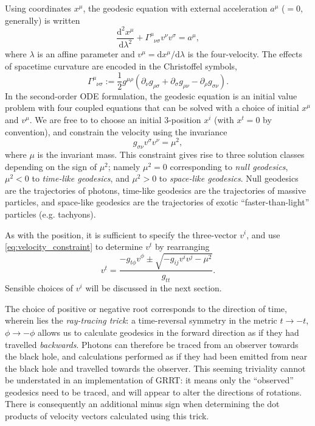 \documentclass[fleqn,usenatbib]{mnras}
\renewcommand{\d}{\text{d}}
\newcommand{\utensor}[3]{#1^{#2}_{\phantom{#2}#3}}
\newcommand{\vel}[1]{v^{#1}}
\begin{document}
Using coordinates $x^\mu$, the geodesic equation with external acceleration
$a^\mu$ ($=0$, generally) is written
\begin{equation}
\label{eq:geodesic_equation}
    \frac{\d^2 x^\mu}{\d \lambda^2}
    + \utensor{\Gamma}{\mu}{\nu\sigma}
    \vel{\nu}
    \vel{\sigma}
    = a^\mu,
\end{equation}
where $\lambda$ is an affine parameter and $v^\mu = \d x^\mu / \d \lambda$ is
the four-velocity. The effects of spacetime curvature are encoded in the
Christoffel symbols,
\begin{equation}
\label{eq:christoffel}
    \utensor{\Gamma}{\mu}{\nu\sigma}
    := \frac{1}{2} g^{\mu\rho}
    \left(
        \partial_{\nu}g_{\rho \sigma}
        + \partial_{\sigma}g_{\rho \nu}
        - \partial_{\rho}g_{\sigma \nu}
    \right).
\end{equation}
In the second-order ODE formulation, the geodesic equation is an initial value
problem with four coupled equations that can be
solved with a choice of initial $x^\mu$ and $\vel{\mu}$. We are free to to
choose an initial 3-position $x^i$ (with $x^t = 0$ by convention), and constrain
the velocity using the invariance
\begin{equation}
\label{eq:velocity_constraint}
    g_{\sigma\nu} \vel{\sigma} \vel{\nu} = \mu^2,
\end{equation}
where $\mu$ is the invariant mass. This constraint gives rise to three solution
classes depending on the sign of $\mu^2$; namely $\mu^2 = 0$ corresponding to
\emph{null geodesics}, $\mu^2 < 0$ to \emph{time-like geodesics}, and $\mu^2 >
0$ to \emph{space-like geodesics}. Null geodesics are the trajectories of
photons, time-like geodesics are the trajectories of massive particles, and
space-like geodesics are the trajectories of exotic ``faster-than-light''
particles (e.g. tachyons).

As with the position, it is sufficient to specify the three-vector $\vel{i}$,
and use \eqref{eq:velocity_constraint} to determine $\vel{t}$ by rearranging
\begin{equation}
\vel{t}  = \frac{-g_{t\phi} \vel{\phi} \pm
    \sqrt{-g_{ij} \vel{i} \vel{j} - \mu^2}
}{g_{tt}}.
\end{equation}
Sensible choices of $v^i$ will be discussed in the next section.

The choice of positive or negative root corresponds to the direction of time,
wherein lies the \textit{ray-tracing trick}: a time-reversal symmetry in the
metric $t \rightarrow -t$, $\phi \rightarrow -\phi$ allows us to calculate
geodesics in the forward direction as if they had travelled \textit{backwards}.
Photons can therefore be traced from an observer towards the black hole, and
calculations performed as if they had been emitted from near the black hole and
travelled towards the observer. This seeming triviality cannot be understated in
an implementation of GRRT: it means only the ``observed'' geodesics need to be
traced, and will appear to alter the directions of rotations. There is
consequently an additional minus sign when determining the dot products of
velocity vectors calculated using this trick.
\end{document}
